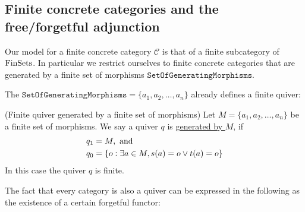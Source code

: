 

\subsection{Finite concrete categories and the free/forgetful adjunction}

Our model for a finite concrete category $\mathcal{C}$ is that of a finite subcategory of $\mathrm{FinSets}$. In particular we restrict ourselves
to finite concrete categories that are generated by a finite set of morphisms $\mathtt{SetOfGeneratingMorphisms}$.

The $\mathtt{SetOfGeneratingMorphisms} = \{ a_{1},a_{2},\dots,a_{n} \}$ already defines a finite quiver:

\begin{definition}{(Finite quiver generated by a finite set of morphisms)}\label{def:quiver_generated}
Let $M = \{ a_{1}, a_{2}, \dots, a_{n} \}$ be a finite set of morphisms. We say a quiver $q$ is \ul{generated by $M$}, if
\begin{align}
q_{1} &= M, \text{ and } \\
q_{0} &= \{ o : \exists a \in M, s(a) = o \vee t(a) = o \}
\end{align}
In this case the quiver $q$ is finite.
\end{definition}

The fact that every category is also a quiver can be expressed in the following as the existence of a certain forgetful functor:

